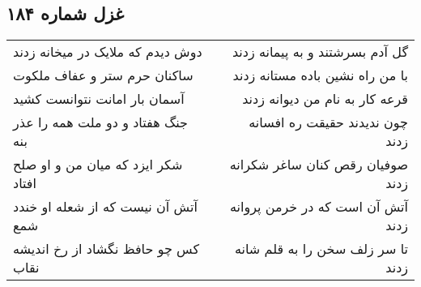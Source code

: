 \begin{center}
\section*{غزل شماره ۱۸۴}
\label{sec:sh184}
\begin{longtable}{l p{0.5cm} r}
دوش دیدم که ملایک در میخانه زدند
&&
گل آدم بسرشتند و به پیمانه زدند
\\
ساکنان حرم ستر و عفاف ملکوت
&&
با من راه نشین باده مستانه زدند
\\
آسمان بار امانت نتوانست کشید
&&
قرعه کار به نام من دیوانه زدند
\\
جنگ هفتاد و دو ملت همه را عذر بنه
&&
چون ندیدند حقیقت ره افسانه زدند
\\
شکر ایزد که میان من و او صلح افتاد
&&
صوفیان رقص کنان ساغر شکرانه زدند
\\
آتش آن نیست که از شعله او خندد شمع
&&
آتش آن است که در خرمن پروانه زدند
\\
کس چو حافظ نگشاد از رخ اندیشه نقاب
&&
تا سر زلف سخن را به قلم شانه زدند
\\
\end{longtable}
\end{center}
